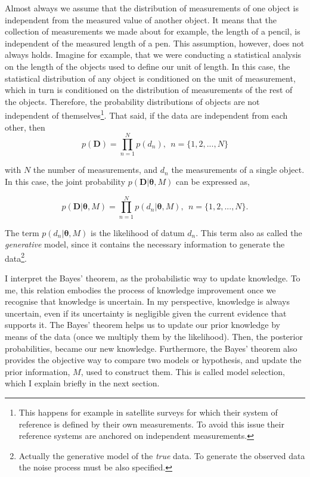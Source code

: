 Almost always we assume that the distribution of measurements of one object is independent from the measured value of another object.  It means that the collection of measurements we made about for example, the length of a pencil, is independent of the measured length of a pen. This assumption, however, does not always holds. Imagine for example, that we were conducting a statistical analysis on the length of the objects used to define our unit of length. In this case, the statistical distribution of any object is conditioned on the unit of measurement, which in turn is conditioned on the distribution of measurements of the rest of the objects. Therefore, the probability distributions of objects are not independent of themselves\footnote{This happens for example in satellite surveys for which their system of reference is defined by their own measurements. To avoid this issue their reference systems are anchored on independent measurements.}. That said, if the data are independent from each other, then
\begin{equation}
 p(\mathbf{D}) = \prod_{n=1}^N p(d_n), \ \ n=\{1,2,...,N\}
\end{equation}

 with $N$ the number of measurements, and $d_n$ the measurements of a single object. In this case, the joint probability  $p(\mathbf{D}|\mathbf{\theta},M)$ can be expressed as,

\begin{equation}
 p(\mathbf{D}|\mathbf{\theta},M) = \prod_{n=1}^N p(d_n|\mathbf{\theta},M), \ \ n=\{1,2,...,N\}.
\end{equation}

The term $p(d_n|\mathbf{\theta},M)$ is the likelihood of datum $d_n$. This term also as called the \emph{generative} model, since it  contains the necessary information to generate the data\footnote{Actually the generative model of the \emph{true} data. To generate the observed data the noise process must be also specified.}.

I interpret the Bayes' theorem, as the probabilistic way to update knowledge. To me, this relation embodies the process of knowledge improvement once we recognise that knowledge is uncertain. In my perspective, knowledge is always uncertain, even if its uncertainty is negligible given the current evidence that supports it. The Bayes' theorem helps us to update our prior knowledge by means of the data (once we multiply them by the likelihood). Then, the posterior probabilities, became our new knowledge. Furthermore, the Bayes' theorem also provides the objective way to compare two models or hypothesis, and update the prior information, $M$, used to construct them. This is called model selection, which I explain briefly in the next section.


